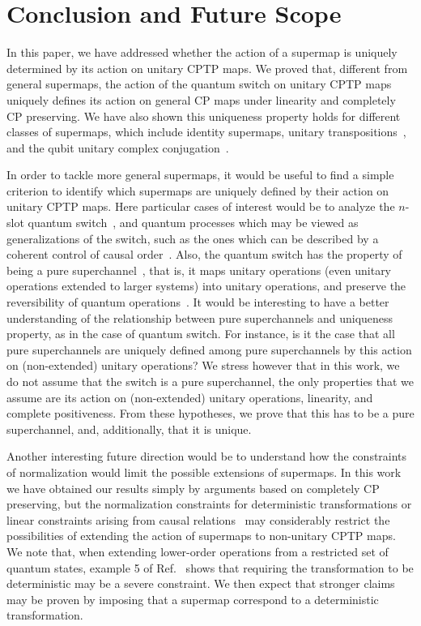 \documentclass[a4paper,twocolumn,accepted=2022-10-23]{quantumarticle}
\theoremstyle{definition}
\begin{document}
\section{Conclusion and Future Scope}\label{sec:conclusion}

In this paper, we have addressed whether the action of a supermap is uniquely determined by its action on unitary CPTP maps.
We proved that, different from general supermaps, the action of the quantum switch on unitary CPTP maps uniquely defines its action on general CP maps under linearity and completely CP preserving.
We have also shown this uniqueness property holds for different classes of supermaps, which include identity supermaps, unitary transpositions~\cite{unitary_inversion2}, and the qubit unitary complex conjugation~\cite{unitary_conjugate}.

In order to tackle more general supermaps, it would be useful to find a simple criterion to identify which supermaps are uniquely defined by their action on unitary CPTP maps. Here particular cases of interest would be to analyze the $n$-slot quantum switch~\cite{qs_discrimination2}, and quantum processes which may be viewed as generalizations of the switch, such as the ones which can be described by a coherent control of causal order~\cite{indefinite_reversible,barrett21,wechs2021quantum}. 
Also, the quantum switch has the property of being a pure superchannel~\cite{indefinite_purification}, that is, it maps unitary operations (even unitary operations extended to larger systems) into unitary operations, and preserve the reversibility of quantum operations~\cite{indefinite_reversible,barrett21}. It would be interesting to have a better understanding of the relationship between pure superchannels and uniqueness property, as in the case of quantum switch. For instance, is it the case that all pure superchannels are  uniquely defined among pure superchannels by this action on (non-extended) unitary operations? We stress however that in this work, we do not assume that the switch is a pure superchannel, the only properties that we assume are its action on (non-extended) unitary operations, linearity, and complete positiveness. From these hypotheses, we prove that this has to be a pure superchannel, and, additionally, that it is unique.

Another interesting future direction would be to understand how the constraints of normalization would limit the possible extensions of supermaps. In this work we have obtained our results simply by arguments based on completely CP preserving, but the normalization constraints for deterministic transformations or linear constraints arising from causal relations~\cite{comb3} may considerably restrict the possibilities of extending the action of supermaps to non-unitary CPTP maps. We note that, when extending lower-order operations from a restricted set of quantum states, example 5 of Ref.~\cite{extending} shows that requiring the transformation to be deterministic may be a severe constraint. We then expect that stronger claims may be proven by imposing that a supermap correspond to a deterministic transformation.
\end{document}
